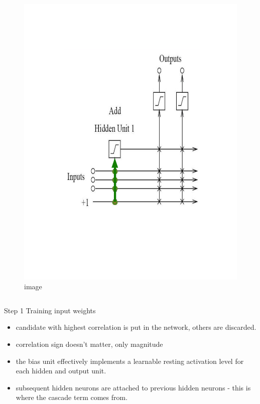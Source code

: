 \documentclass[presentation]{beamer}
\begin{document}
\begin{frame}
\begin{columns}[t]
\begin{column}{0.5\textwidth}
\begin{figure}
        \includegraphics[scale=0.28]{trainInputunit.png}
        \caption{image}
      \end{figure}			
		\end{column}
	\end{columns}
\end{frame}



\begin{frame}{Step 1 Training input weights}
  \begin{itemize}
    \item candidate with highest correlation is put in the network, others are discarded.
    \item correlation sign doesn't matter, only magnitude
    \item the bias unit effectively implements a learnable resting activation level for each hidden and output unit.
    \item subsequent hidden neurons are attached to previous hidden neurons - this is where the cascade term comes from.
  \end{itemize}
\end{frame}
\end{document}
